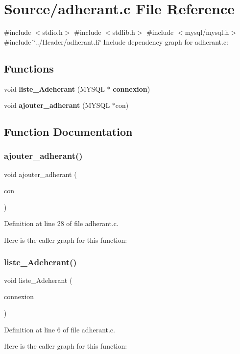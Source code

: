 \section{Source/adherant.c File Reference}
\label{adherant_8c}
{\ttfamily \#include $<$stdio.\+h$>$}\newline
{\ttfamily \#include $<$stdlib.\+h$>$}\newline
{\ttfamily \#include $<$mysql/mysql.\+h$>$}\newline
{\ttfamily \#include \char`\"{}../\+Header/adherant.\+h\char`\"{}}\newline
Include dependency graph for adherant.\+c\+:
\subsection*{Functions}
\begin{DoxyCompactItemize}
\item 
void \textbf{ liste\+\_\+\+Adeherant} (M\+Y\+S\+QL $\ast$\textbf{ connexion})
\item 
void \textbf{ ajouter\+\_\+adherant} (M\+Y\+S\+QL $\ast$con)
\end{DoxyCompactItemize}


\subsection{Function Documentation}
\mbox{\label{adherant_8c_a9982c502229cdf9ca9d7efd9756b6a95}} 
\subsubsection{ajouter\+\_\+adherant()}
{\footnotesize\ttfamily void ajouter\+\_\+adherant (\begin{DoxyParamCaption}\item[{M\+Y\+S\+QL $\ast$}]{con }\end{DoxyParamCaption})}



Definition at line 28 of file adherant.\+c.

Here is the caller graph for this function\+:
\mbox{\label{adherant_8c_a9a3c615db5a86eab8746f2ddbae1bcac}} 
\subsubsection{liste\+\_\+\+Adeherant()}
{\footnotesize\ttfamily void liste\+\_\+\+Adeherant (\begin{DoxyParamCaption}\item[{M\+Y\+S\+QL $\ast$}]{connexion }\end{DoxyParamCaption})}



Definition at line 6 of file adherant.\+c.

Here is the caller graph for this function\+:
